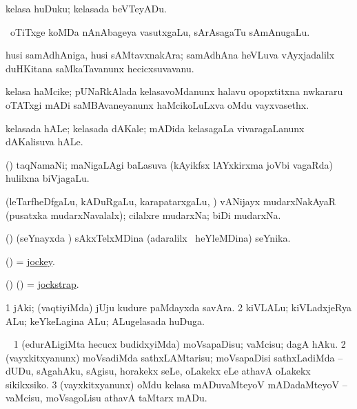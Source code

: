 \bentry
{}
\gl{\sakirx}
\bmng
kelasa huDuku; kelasada beVTeyADu. 
\emng
\eentry

\bentry
{}
\gl{\nA}
\bmng
\kanmu\ oTiTxge koMDa nAnAbageya vasutxgaLu, sArAsagaTu sAmAnugaLu. 
\emng
\eentry

\bentry
{}
\gl{\nA}
\bmng
husi samAdhAniga, husi sAMtavxnakAra; samAdhAna heVLuva vAyxjadalilx duHKitana saMkaTavanunx hecicxsuvavanu. 
\emng
\eentry

\bentry
{}
\gl{\nA}
\bmng
kelasa haMcike; pUNaRkAlada kelasavoMdanunx halavu opopxtitxna nwkararu oTATxgi mADi saMBAvaneyanunx haMcikoLuLxva oMdu vayxvasethx. 
\emng
\eentry

\bentry
{}
\gl{\nA}
\bmng
kelasada hALe; kelasada dAKale; mADida kelasagaLa vivaragaLanunx dAKalisuva hALe. 
\emng
\eentry

\bentry
{}
\gl{\nA}
\bmng
(\bava) taqNamaNi; maNigaLAgi baLasuva (kAyikfsx lAYxkirxma joVbi vagaRda) hulilxna biVjagaLu. 
\emng
\eentry

\bentry
{}
\gl{\nA}
\bmng
(leTarfheDfgaLu, kADuRgaLu, karapatarxgaLu, \mo) vANijayx mudarxNakAyaR (pusatxka mudarxNavalalx); cilalxre mudarxNa; biDi mudarxNa. 
\emng
\eentry

\bentry
{}
\gl{\nA}
\bmng
(\birx) (seYnayxda \ashi) sAkxTelxMDina (adaralilx \kanmu\ heYleMDina) seYnika. 
\emng
\eentry

\bentry
{}
\gl{\nA}
\bmng
(\AmA) = \hyperlink{jockey(1)}{jockey}. 
\emng
\eentry

\bentry
{}
\gl{\nA}
\bmng
(\ame) (\ashi)  = \hyperlink{jockstrap}{jockstrap}. 
\emng
\eentry

\bentry
{}
\gl{\nA}
\bmng
\bnum
\num{1} jAki; (vaqtiyiMda) jUju kudure paMdayxda savAra. 
\num{2} kiVLALu; kiVLadxjeRya ALu; keYkeLagina ALu; ALugelasada huDuga. 
\enum
\emng
\eentry

\bentry
{}
\gl{\kirx}
\bmng
 \sakirx\ 
\bnum
\num{1} (edurALigiMta hecucx budidxyiMda) moVsapaDisu; vaMcisu; dagA hAku. 
\num{2} (vayxkitxyanunx) moVsadiMda sathxLAMtarisu; moVsapaDisi sathxLadiMda -- dUDu, sAgahAku, sAgisu, horakekx seLe, oLakekx eLe athavA oLakekx sikikxsiko. 
\num{3} (vayxkitxyanunx) oMdu kelasa mADuvaMteyoV mADadaMteyoV -- vaMcisu, moVsagoLisu athavA taMtarx mADu. 
\enum
\emng

